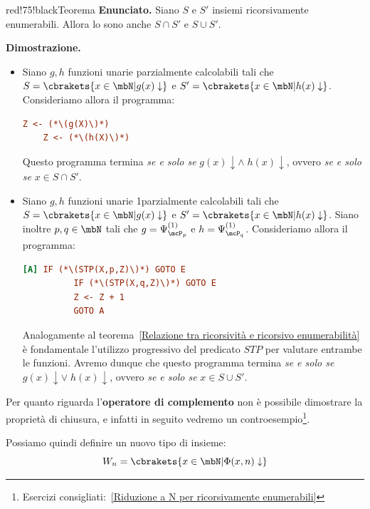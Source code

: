 \begin{halfframedbox}{red!75!black}{Teorema}
  \textbf{Enunciato. } Siano \(S\) e \(S'\) insiemi ricorsivamente enumerabili. Allora lo sono anche \(S\cap S'\) e \(S\cup S'\).
  \begin{center}
    \textcolor{red!75!black}{\hdashrule[0.5ex]{18cm}{1pt}{3mm 3pt 1mm 2pt}}
  \end{center}
  \textbf{Dimostrazione. }
  \begin{itemize}
    \item[\(\cap \):] Siano \(g,h\) funzioni unarie  parzialmente calcolabili tali che \(S=\cbrakets{x \in \mbN \vert g(x) \downarrow}\) e \(S'=\cbrakets{x \in \mbN \vert h(x) \downarrow}\). Consideriamo allora il programma:
    \begin{lstlisting}[language= ini, caption = { }, nolol]
    Z <- (*\(g(X)\)*)
    Z <- (*\(h(X)\)*)
    \end{lstlisting}
    Questo programma termina \textit{se e solo se} \(g(x)\downarrow\land \; h(x)\downarrow\), ovvero \textit{se e solo se} \(x\in S\cap S'\).
    \item [\(\cup \):] Siano \(g,h\) funzioni unarie  1parzialmente calcolabili tali che \(S=\cbrakets{x \in \mbN \vert g(x) \downarrow}\) e \(S'=\cbrakets{x \in \mbN \vert h(x) \downarrow}\). Siano inoltre \(p,q\in\mbN\) tali che \(g=\Psi_{\mcP_p}^{(1)}\) e \(h=\Psi_{\mcP_q}^{(1)}\). Consideriamo allora il programma:
    \begin{lstlisting}[language= ini, caption = { }, nolol]
      [A] IF (*\(STP(X,p,Z)\)*) GOTO E
          IF (*\(STP(X,q,Z)\)*) GOTO E
          Z <- Z + 1
          GOTO A
    \end{lstlisting}
    Analogamente al teorema~\ref{Relazione tra ricorsività e ricorsivo enumerabilità} è fondamentale l'utilizzo progressivo del predicato \(STP\) per valutare entrambe le funzioni. Avremo dunque che questo programma termina \textit{se e solo se} \(g(x)\downarrow \lor \; h(x)\downarrow\), ovvero \textit{se e solo se} \(x\in S\cup S'\).
  \end{itemize}
\end{halfframedbox}

Per quanto riguarda l'\textbf{operatore di complemento} non è possibile dimostrare la proprietà di chiusura, e infatti in seguito vedremo un controesempio\footnote{Esercizi consigliati:~\ref{Riduzione a N per ricorsivamente enumerabili}}.

Possiamo quindi definire un nuovo tipo di insieme:
\begin{equation}
  W_n=\cbrakets{x \in \mbN \vert \Phi(x, n) \downarrow}
\end{equation}

